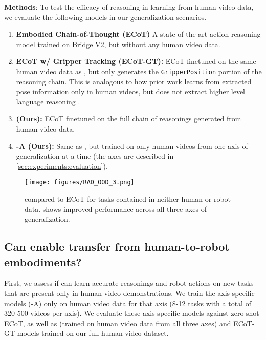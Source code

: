 \smallskip \noindent \textbf{Methods}: To test the efficacy of reasoning in learning from human video data, we evaluate the following models in our generalization scenarios.
\begin{enumerate}
    \item \textbf{Embodied Chain-of-Thought (ECoT)} \cite{zawalski2024robotic} A state-of-the-art action reasoning model trained on Bridge V2, but without any human video data.
    \item \textbf{ECoT w/ Gripper Tracking (ECoT-GT):} ECoT finetuned on the same human video data as \ACRO, but only generates the \texttt{GripperPosition} portion of the reasoning chain. This is analogous to how prior work learns from extracted pose information only in human videos, but does not extract higher level language reasoning \cite{papagiannis2024r+, lepertshadow, ren2025motion}.
    \item \textbf{\ACRO (Ours):} ECoT finetuned on the full chain of reasonings generated from human video data.
    \item \textbf{\ACRO-A (Ours):} Same as \ACRO, but trained on only human videos from one axis of generalization at a time (the axes are described in \cref{sec:experiments:evaluation}).
\end{enumerate}

\begin{figure*}[!ht]
    \centering
    \texttt{[image: figures/RAD\_OOD\_3.png]}
    \caption{\ACRO compared to ECoT for tasks contained in neither human or robot data. \ACRO shows improved performance across all three axes of generalization.}
    \label{fig:ood_plot}
\end{figure*}

\subsection{Can \ACRO enable transfer from human-to-robot embodiments?}\label{sec:experiments:crossembodiment}

First, we assess if \ACRO can learn accurate reasonings and robot actions on new tasks that are present only in human video demonstrations. 
We train the axis-specific models (\ACRO-A) only on human video data for that axis (8-12 tasks with a total of 320-500 videos per axis). We evaluate these axis-specific models against zero-shot ECoT, as well as \ACRO (trained on human video data from all three axes) and ECoT-GT models trained on our full human video dataset.

